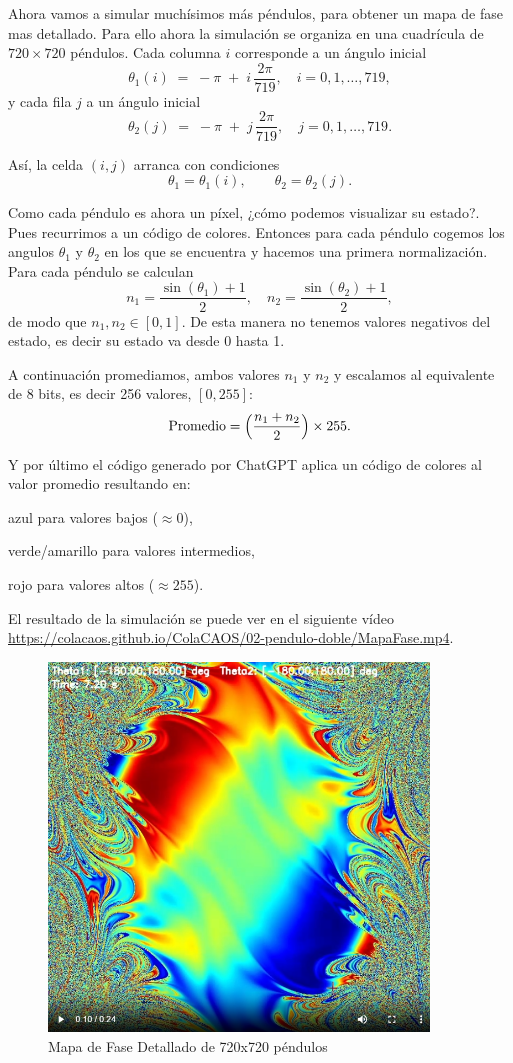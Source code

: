 \documentclass[
  10pt,
  a4paper,
  DIV=11,
  numbers=noendperiod,
  open=any]{scrreprt}
\numberwithin{equation}{chapter}
\numberwithin{equation}{section}
\renewcommand{\[}{\begin{equation}}
\renewcommand{\]}{\end{equation}}
\begin{document}
Ahora vamos a simular muchísimos más péndulos, para obtener un mapa de
fase mas detallado. Para ello ahora la simulación se organiza en una
cuadrícula de \(720 \times 720\) péndulos. Cada columna \(i\)
corresponde a un ángulo inicial \[
\theta_1(i) \;=\; -\pi \;+\; i\,\frac{2\pi}{719}, 
\quad i = 0,1,\dots,719,
\] y cada fila \(j\) a un ángulo inicial \[
\theta_2(j) \;=\; -\pi \;+\; j\,\frac{2\pi}{719}, 
\quad j = 0,1,\dots,719.
\]

Así, la celda \((i,j)\) arranca con condiciones \[
\theta_1 = \theta_1(i), 
\qquad
\theta_2 = \theta_2(j).
\]

Como cada péndulo es ahora un píxel, ¿cómo podemos visualizar su
estado?. Pues recurrimos a un código de colores. Entonces para cada
péndulo cogemos los angulos \(\theta_1\) y \(\theta_2\) en los que se
encuentra y hacemos una primera normalización. Para cada péndulo se
calculan \[
     n_1 = \frac{\sin(\theta_1) + 1}{2},
     \quad
     n_2 = \frac{\sin(\theta_2) + 1}{2},
   \] de modo que \(n_1,n_2 \in [0,1]\). De esta manera no tenemos
valores negativos del estado, es decir su estado va desde 0 hasta 1.

A continuación promediamos, ambos valores \(n_1\) y \(n_2\) y escalamos
al equivalente de 8 bits, es decir 256 valores, \([0,255]\): \[
     \text{Promedio} = \Bigl(\frac{n_1 + n_2}{2}\Bigr)\times 255.
   \]

Y por último el código generado por ChatGPT aplica un código de colores
al valor promedio resultando en:

azul para valores bajos (\(\approx 0\)),

verde/amarillo para valores intermedios,

rojo para valores altos (\(\approx 255\)).

El resultado de la simulación se puede ver en el siguiente vídeo \url{https://colacaos.github.io/ColaCAOS/02-pendulo-doble/MapaFase.mp4}.

\begin{figure}[h]
  \centering
  \includegraphics[width=0.9\textwidth]{02-pendulo-doble/mapafases2.png}
  \caption{Mapa de Fase Detallado de 720x720 péndulos}
\end{figure}
\end{document}
